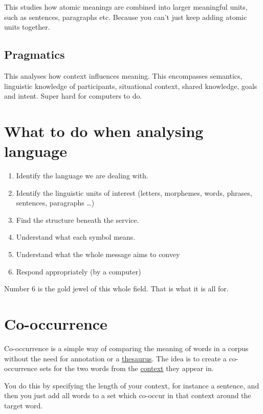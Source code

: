 \documentclass[
  11pt,
  british,
]{article}
\providecommand{\tightlist}{%
  \setlength{\itemsep}{0pt}\setlength{\parskip}{0pt}}
\begin{document}
This studies how atomic meanings are combined into larger meaningful
units, such as sentences, paragraphs etc. Because you can't just keep
adding atomic units together.

\hypertarget{pragmatics}{%
\subsection{Pragmatics}\label{pragmatics}}

This analyses how context influences meaning. This encompasses
semantics, linguistic knowledge of participants, situational context,
shared knowledge, goals and intent. Super hard for computers to do.

\hypertarget{what-to-do-when-analysing-language}{%
\section{What to do when analysing
language}\label{what-to-do-when-analysing-language}}

\begin{enumerate}
\def\labelenumi{\arabic{enumi}.}
\tightlist
\item
  Identify the language we are dealing with.
\item
  Identify the linguistic units of interest (letters, morphemes, words,
  phrases, sentences, paragraphs \ldots)
\item
  Find the structure beneath the service.
\item
  Understand what each symbol means.
\item
  Understand what the whole message aims to convey
\item
  Respond appropriately (by a computer)
\end{enumerate}

Number 6 is the gold jewel of this whole field. That is what it is all
for.

\hypertarget{co-occurrence}{%
\section{Co-occurrence}\label{co-occurrence}}

Co-occurrence is a simple way of comparing the meaning of words in a
corpus without the need for annotation or a
\href{../Data/Thesaurus.md}{thesaurus}. The idea is to create a
co-occurrence sets for the two words from the \href{Context.md}{context}
they appear in.

You do this by specifying the length of your context, for instance a
sentence, and then you just add all words to a set which co-occur in
that context around the target word.
\end{document}
